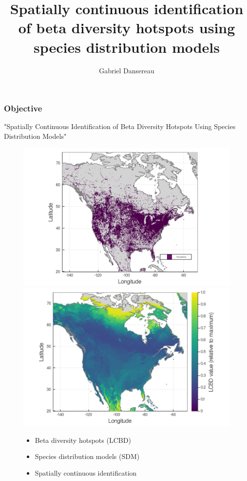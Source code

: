 \documentclass[10pt]{beamer}
\title{Spatially continuous identification of beta diversity hotspots using species distribution models}
\author{Gabriel Dansereau}
\begin{document}
\begin{frame}
  \titlepage
\end{frame}

\begin{frame}
  \frametitle{Objective}
  \begin{displayquote}
    "Spatially Continuous Identification of Beta Diversity Hotspots Using Species Distribution Models"
  \end{displayquote}
  \begin{figure}
    \centering
    \hspace*{0.0cm}\includegraphics[scale=0.08]{fig/01_raw_singlesp.png}
    \hspace*{0.0cm}\includegraphics[scale=0.08]{fig/05_sdm_lcbd.png}
    \hspace{4.0cm}\begin{itemize}
      \item Beta diversity hotspots (LCBD)
      \item Species distribution models (SDM)
      \item Spatially continuous identification
    \end{itemize}
  \end{figure}
\end{frame}
\end{document}
